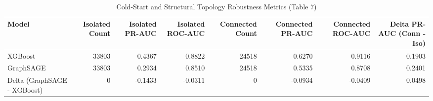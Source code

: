 \begin{table}
\caption{Cold-Start and Structural Topology Robustness Metrics (Table 7)}
\label{tab:coldstart_metrics}
\begin{tabular}{lrrrrrrr}
\toprule
Model & Isolated Count & Isolated PR-AUC & Isolated ROC-AUC & Connected Count & Connected PR-AUC & Connected ROC-AUC & Delta PR-AUC (Conn - Iso) \\
\midrule
XGBoost & 33803 & 0.4367 & 0.8822 & 24518 & 0.6270 & 0.9116 & 0.1903 \\
GraphSAGE & 33803 & 0.2934 & 0.8510 & 24518 & 0.5335 & 0.8708 & 0.2401 \\
Delta (GraphSAGE - XGBoost) & 0 & -0.1433 & -0.0311 & 0 & -0.0934 & -0.0409 & 0.0498 \\
\bottomrule
\end{tabular}
\end{table}
